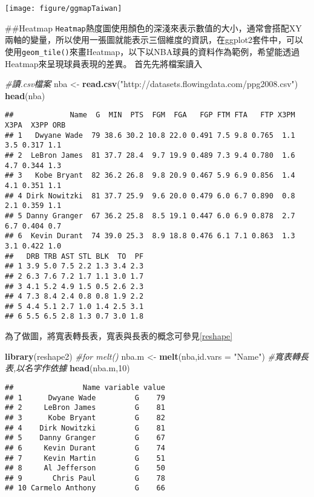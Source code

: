 \documentclass[
]{book}
\newenvironment{Shaded}{\begin{snugshade}}{\end{snugshade}}
\newcommand{\CommentTok}[1]{\textcolor[rgb]{0.56,0.35,0.01}{\textit{#1}}}
\newcommand{\DataTypeTok}[1]{\textcolor[rgb]{0.13,0.29,0.53}{#1}}
\newcommand{\DecValTok}[1]{\textcolor[rgb]{0.00,0.00,0.81}{#1}}
\newcommand{\KeywordTok}[1]{\textcolor[rgb]{0.13,0.29,0.53}{\textbf{#1}}}
\newcommand{\NormalTok}[1]{#1}
\newcommand{\StringTok}[1]{\textcolor[rgb]{0.31,0.60,0.02}{#1}}
\begin{document}
\texttt{[image: figure/ggmapTaiwan]}

\#\#Heatmap
\texttt{Heatmap}熱度圖使用顏色的深淺來表示數值的大小，通常會搭配XY兩軸的變量，所以使用一張圖就能表示三個維度的資訊，在ggplot2套件中，可以使用\texttt{geom\_tile()}來畫Heatmap，以下以NBA球員的資料作為範例，希望能透過Heatmap來呈現球員表現的差異。
首先先將檔案讀入

\begin{Shaded}
\begin{Highlighting}[]
\CommentTok{#讀.csv檔案}
\NormalTok{nba <-}\StringTok{ }\KeywordTok{read.csv}\NormalTok{(}\StringTok{"http://datasets.flowingdata.com/ppg2008.csv"}\NormalTok{)}
\KeywordTok{head}\NormalTok{(nba)}
\end{Highlighting}
\end{Shaded}

\begin{verbatim}
##             Name  G  MIN  PTS  FGM  FGA   FGP FTM FTA   FTP X3PM X3PA  X3PP ORB
## 1   Dwyane Wade  79 38.6 30.2 10.8 22.0 0.491 7.5 9.8 0.765  1.1  3.5 0.317 1.1
## 2  LeBron James  81 37.7 28.4  9.7 19.9 0.489 7.3 9.4 0.780  1.6  4.7 0.344 1.3
## 3   Kobe Bryant  82 36.2 26.8  9.8 20.9 0.467 5.9 6.9 0.856  1.4  4.1 0.351 1.1
## 4 Dirk Nowitzki  81 37.7 25.9  9.6 20.0 0.479 6.0 6.7 0.890  0.8  2.1 0.359 1.1
## 5 Danny Granger  67 36.2 25.8  8.5 19.1 0.447 6.0 6.9 0.878  2.7  6.7 0.404 0.7
## 6  Kevin Durant  74 39.0 25.3  8.9 18.8 0.476 6.1 7.1 0.863  1.3  3.1 0.422 1.0
##   DRB TRB AST STL BLK  TO  PF
## 1 3.9 5.0 7.5 2.2 1.3 3.4 2.3
## 2 6.3 7.6 7.2 1.7 1.1 3.0 1.7
## 3 4.1 5.2 4.9 1.5 0.5 2.6 2.3
## 4 7.3 8.4 2.4 0.8 0.8 1.9 2.2
## 5 4.4 5.1 2.7 1.0 1.4 2.5 3.1
## 6 5.5 6.5 2.8 1.3 0.7 3.0 1.8
\end{verbatim}

為了做圖，將寬表轉長表，寬表與長表的概念可參見\ref{reshape}

\begin{Shaded}
\begin{Highlighting}[]
\KeywordTok{library}\NormalTok{(reshape2) }\CommentTok{#for melt()}
\NormalTok{nba.m <-}\StringTok{ }\KeywordTok{melt}\NormalTok{(nba,}\DataTypeTok{id.vars =} \StringTok{"Name"}\NormalTok{) }\CommentTok{#寬表轉長表,以名字作依據}
\KeywordTok{head}\NormalTok{(nba.m,}\DecValTok{10}\NormalTok{)}
\end{Highlighting}
\end{Shaded}

\begin{verbatim}
##                Name variable value
## 1      Dwyane Wade         G    79
## 2     LeBron James         G    81
## 3      Kobe Bryant         G    82
## 4    Dirk Nowitzki         G    81
## 5    Danny Granger         G    67
## 6     Kevin Durant         G    74
## 7     Kevin Martin         G    51
## 8     Al Jefferson         G    50
## 9       Chris Paul         G    78
## 10 Carmelo Anthony         G    66
\end{verbatim}
\end{document}
